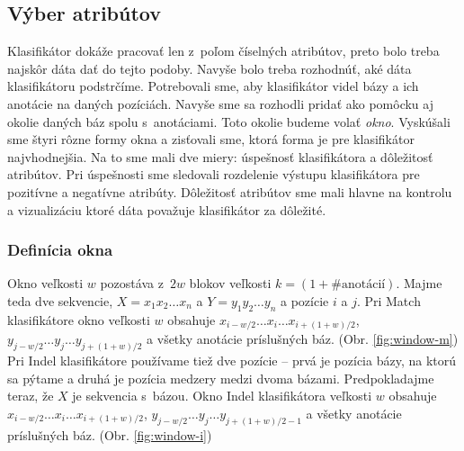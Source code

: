 \subsection{Výber atribútov}

Klasifikátor dokáže pracovať len z~poľom číselných atribútov, preto bolo treba najskôr dáta dať do tejto podoby. Navyše bolo treba rozhodnúť, aké dáta klasifikátoru podstrčíme. Potrebovali sme, aby klasifikátor videl bázy a ich anotácie na daných pozíciách. Navyše sme sa rozhodli pridať ako pomôcku aj okolie daných báz spolu s~anotáciami. Toto okolie budeme volať \textit{okno}. Vyskúšali sme štyri rôzne formy okna a zisťovali sme, ktorá forma je pre klasifikátor najvhodnejšia. Na to sme mali dve miery: úspešnosť klasifikátora a dôležitosť atribútov. Pri úspešnosti sme sledovali rozdelenie výstupu klasifikátora pre pozitívne a negatívne atribúty. Dôležitosť atribútov sme mali hlavne na kontrolu a vizualizáciu ktoré dáta považuje klasifikátor za dôležité.

\subsubsection{Definícia okna}
Okno veľkosti $w$ pozostáva z~$2w$ blokov veľkosti $k = (1+\#\text{anotácií})$.
Majme teda dve sekvencie, $X = x_1 x_2 \dots x_n$ a $Y = y_1 y_2 \dots y_n$ a pozície $i$ a $j$.
Pri Match klasifikátore okno veľkosti $w$ obsahuje $x_{i - w/2}\dots x_i \dots x_{i + (1 + w)/2}$, $y_{j - w/2}\dots y_j \dots y_{j + (1 + w)/2}$ a všetky anotácie príslušných báz. (Obr. \ref{fig:window-m})
Pri Indel klasifikátore používame tiež dve pozície -- prvá je pozícia bázy, na ktorú sa pýtame a druhá je pozícia medzery medzi dvoma bázami.
Predpokladajme teraz, že $X$ je sekvencia s~bázou. Okno Indel klasifikátora veľkosti $w$ obsahuje $x_{i - w/2}\dots x_i \dots x_{i + (1 + w)/2}$, $y_{j - w/2}\dots y_j \dots y_{j + (1 + w)/2 - 1}$ a všetky anotácie príslušných báz. (Obr. \ref{fig:window-i})

